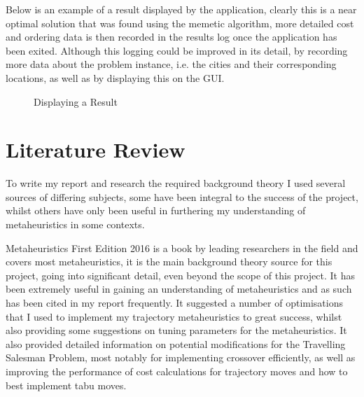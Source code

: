 \documentclass[]{final_report}
\begin{document}
\newpage
Below is an example of a result displayed by the application, clearly this is a near optimal solution that was found using the memetic algorithm, more detailed cost and ordering data is then recorded in the results log once the application has been exited. Although this logging could be improved in its detail, by recording more data about the problem instance, i.e. the cities and their corresponding locations, as well as by displaying this on the GUI.

\begin{figure}[h]
	\centering
	\fboxsep 2mm
	\caption{\label{fig:tsp} Displaying a Result}
\end{figure}

\chapter*{Literature Review}

To write my report and research the required background theory I used several sources of differing subjects, some have been integral to the success of the project, whilst others have only been useful in furthering my understanding of metaheuristics in some contexts.

Metaheuristics First Edition 2016\cite{siarry:2016} is a book by leading researchers in the field and covers most metaheuristics, it is the main background theory source for this project, going into significant detail, even beyond the scope of this project. It has been extremely useful in gaining an understanding of metaheuristics and as such has been cited in my report frequently. It suggested a number of optimisations that I used to implement my trajectory metaheuristics to great success, whilst also providing some suggestions on tuning parameters for the metaheuristics. It also provided detailed information on potential modifications for the Travelling Salesman Problem, most notably for implementing crossover efficiently, as well as improving the performance of cost calculations for trajectory moves and how to best implement tabu moves.
\end{document}
